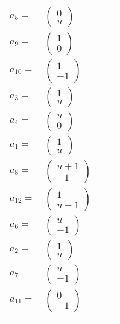 \documentclass[1p]{elsarticle_modified}
\theoremstyle{definition}
\begin{document}
\begin{tabular}{m{7pt} m{180pt} m{7pt} m{180pt} }
\flushright $a_{5}=$&$\begin{pmatrix}0\\u\end{pmatrix}$ \\
\flushright $a_{9}=$&$\begin{pmatrix}1\\0\end{pmatrix}$ \\
\flushright $a_{10}=$&$\begin{pmatrix}1\\-1\end{pmatrix}$ \\
\flushright $a_{3}=$&$\begin{pmatrix}1\\u\end{pmatrix}$ \\
\flushright $a_{4}=$&$\begin{pmatrix}u\\0\end{pmatrix}$ \\
\flushright $a_{1}=$&$\begin{pmatrix}1\\u\end{pmatrix}$ \\
\flushright $a_{8}=$&$\begin{pmatrix}u+1\\-1\end{pmatrix}$ \\
\flushright $a_{12}=$&$\begin{pmatrix}1\\u-1\end{pmatrix}$ \\
\flushright $a_{6}=$&$\begin{pmatrix}u\\-1\end{pmatrix}$ \\
\flushright $a_{2}=$&$\begin{pmatrix}1\\u\end{pmatrix}$ \\
\flushright $a_{7}=$&$\begin{pmatrix}u\\-1\end{pmatrix}$ \\
\flushright $a_{11}=$&$\begin{pmatrix}0\\-1\end{pmatrix}$\\&\end{tabular}
\end{document}

